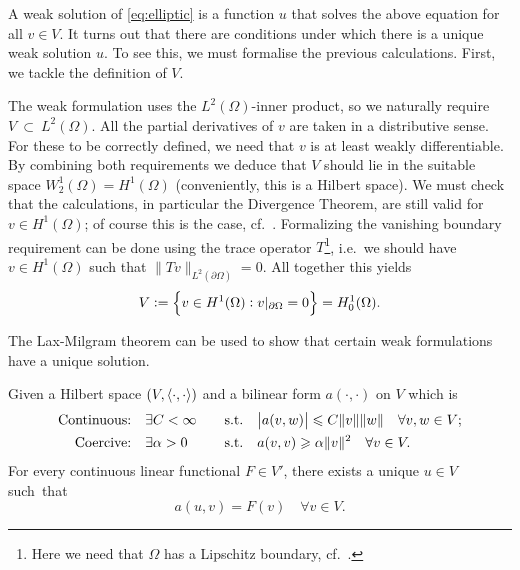 \documentclass[thesis.tex]{subfiles}
\begin{document}
A weak solution of \eqref{eq:elliptic} is a function $u$ that solves the above equation for all $v \in V$.
It turns out that there are conditions under which there is a unique weak solution $u$. To see this,
we must formalise the previous calculations. First, we tackle the definition of $V$.

The weak formulation uses the $L^2(\Omega)$-inner product, so we naturally require~$V~\subset~L^2(\Omega)$.
All the partial derivatives of $v$ are taken in a distributive sense.
For these to be correctly defined, we need that $v$ is at least weakly differentiable.
By combining both requirements we deduce that $V$ should lie in the suitable space 
$W_2^1(\Omega) = H^1(\Omega)$ (conveniently, this is a Hilbert space).
We must check that the calculations, in particular the Divergence Theorem, are still valid for $v \in H^1(\Omega)$;
of course this is the case, cf.~\cite[Ch. 5]{brenner}.
Formalizing the vanishing boundary requirement can be done using the trace operator $T$\footnote{Here we need that $\Omega$ has a Lipschitz boundary, cf.~\cite[Ch. 1.6]{brenner}.},
i.e.~we should have $v \in H^1(\Omega)$ such that $\|Tv\|_{L^2(\partial \Omega)} = 0$. All together this yields
\[
  V := \set{v \in H^1(\Omega): v|_{\partial \Omega} = 0} = H_0^1(\Omega).
\]

The Lax-Milgram theorem can be used to show that certain weak formulations have a unique solution.
\begin{thm}
  \label{thm:lax}
  Given a Hilbert space $(V, \langle \cdot, \cdot \rangle)$ and a bilinear form $a(\cdot,\cdot)$ on $V$ which is
  \begin{alignat*}{3}
    \text{Continuous:} \quad & \exists C < \infty \quad & \text{s.t.} \quad & \abs{a(v,w)} \leqslant C \|v\|\|w\| \quad \forall v,w \in V; \\
    \text{Coercive:}   \quad & \exists \alpha > 0 \quad &\text{s.t.} \quad & a(v,v) \geqslant \alpha \|v\|^2 \quad \forall v \in V.
  \end{alignat*}
  For every continuous linear functional $F \in V'$, there exists a unique $u \in V$ such~that
  \[
    a(u,v) = F(v) \quad \forall v\in V.
  \]
\end{thm}
\end{document}
